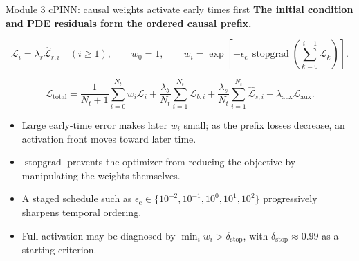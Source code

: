 \documentclass[aspectratio=169,10pt]{beamer}
\begin{document}
\begin{frame}{Module 3 cPINN: causal weights activate early times first}
\footnotesize
\textbf{The initial condition and PDE residuals form the ordered causal prefix.}

\vspace{-0.2em}
\begin{equation*}
\mathcal L_i=\lambda_r\widehat{\mathcal L}_{r,i}
\quad(i\geq1),
\qquad
w_0=1,
\qquad
\boxed{
w_i=
\exp\left[
-\epsilon_{\mathrm c}\,
\operatorname{stopgrad}
\left(
\sum_{k=0}^{i-1}\mathcal L_k
\right)
\right]
}.
\end{equation*}

\vspace{-0.3em}
\begin{equation*}
\boxed{
\mathcal L_{\mathrm{total}}
=
\frac{1}{N_t+1}\sum_{i=0}^{N_t}w_i\mathcal L_i
+\frac{\lambda_b}{N_t}\sum_{i=1}^{N_t}\widehat{\mathcal L}_{b,i}
+\frac{\lambda_s}{N_t}\sum_{i=1}^{N_t}\widehat{\mathcal L}_{s,i}
+\lambda_{\mathrm{aux}}\mathcal L_{\mathrm{aux}}
}.
\end{equation*}

\vspace{-0.2em}
\begin{itemize}
    \item Large early-time error makes later $w_i$ small; as the prefix losses decrease, an activation front moves toward later time.
    \item $\operatorname{stopgrad}$ prevents the optimizer from reducing the objective by manipulating the weights themselves.
    \item A staged schedule such as
    $\epsilon_{\mathrm c}\in\{10^{-2},10^{-1},10^0,10^1,10^2\}$
    progressively sharpens temporal ordering.
    \item Full activation may be diagnosed by $\min_i w_i>\delta_{\mathrm{stop}}$, with $\delta_{\mathrm{stop}}\approx0.99$ as a starting criterion.
\end{itemize}
\end{frame}
\end{document}
